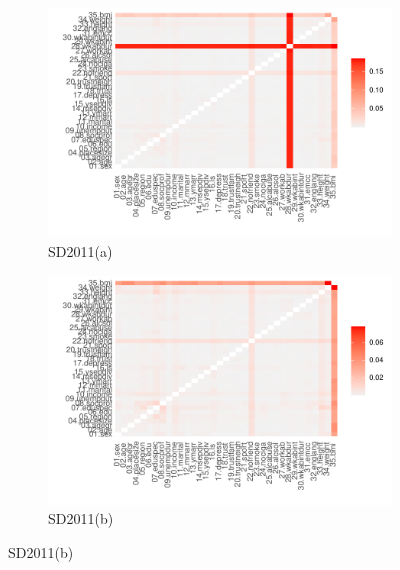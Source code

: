 \begin{figure}[ht]
  \caption{Datasynthesizer two-way correlation  (pMSE)}
  \label{fig:ds_fidelity_two_way}
  \centering

  \begin{subfigure}{0.75\textwidth}
    \includegraphics[width=\linewidth]{../graphs/datasynthesizer/datasynthesizer_fidelity_twoway_sd2011.pdf}
    \caption{SD2011(a)}
    \label{subfig:ds_fidelity_two_way_subfig-a}
  \end{subfigure}

  \begin{subfigure}{0.75\textwidth}
    \includegraphics[width=\linewidth]{../graphs/datasynthesizer/datasynthesizer_fidelity_twoway_sd2011_clean.pdf}
    \caption{SD2011(b)}
    \label{subfig:ds_fidelity_two_way_subfig-b}
  \end{subfigure}


\end{figure}
